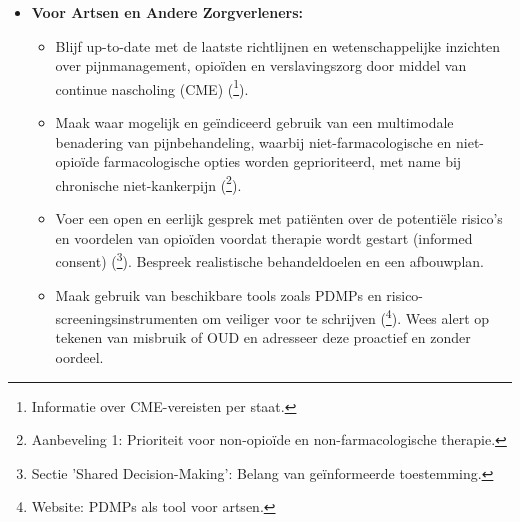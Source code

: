 \documentclass[11pt, a4paper]{report} %
\begin{document}
\begin{itemize}
\begin{itemize}
            \item Investeer in brede preventieprogramma's, gericht op zowel publieksvoorlichting als op het aanpakken van onderliggende sociaaleconomische risicofactoren voor middelengebruik en verslaving (\cite{Yarosh2020ComputationalSupportSUD}\footnote{Sectie 3.1 'Detecting and Mitigating Risk': Noemt preventie en aanpak van risicofactoren.}).
            \item Werk internationaal samen om de illegale productie en handel in fentanyl en andere synthetische drugs aan te pakken, inclusief controle op precursors (\cite{Pardo2019FutureFentanyl}\footnote{Pag. xiii: "International cooperation will be critical..."}).
            \item Werk actief aan het dichten van de mondiale pijnkloof door het ondersteunen van initiatieven die de veilige toegang tot essentiële opioïde pijnstillers in lage- en middeninkomenslanden verbeteren (\cite{INCB2024Report}\footnote{Nieuwsbericht: Roept op tot het adresseren van ongelijkheden in toegang tot pijnmedicatie.}).
        \end{itemize}
    \item \textbf{Voor Artsen en Andere Zorgverleners:}
        \begin{itemize}
            \item Blijf up-to-date met de laatste richtlijnen en wetenschappelijke inzichten over pijnmanagement, opioïden en verslavingszorg door middel van continue nascholing (CME) (\cite{BallotpediaStateLimits}\footnote{Informatie over CME-vereisten per staat.}).
            \item Maak waar mogelijk en geïndiceerd gebruik van een multimodale benadering van pijnbehandeling, waarbij niet-farmacologische en niet-opioïde farmacologische opties worden geprioriteerd, met name bij chronische niet-kankerpijn (\cite{Dowell2016CDCGuideline}\footnote{Aanbeveling 1: Prioriteit voor non-opioïde en non-farmacologische therapie.}).
            \item Voer een open en eerlijk gesprek met patiënten over de potentiële risico's en voordelen van opioïden voordat therapie wordt gestart (informed consent) (\cite{Hooten2021OpioidsChronicPain}\footnote{Sectie 'Shared Decision-Making': Belang van geïnformeerde toestemming.}). Bespreek realistische behandeldoelen en een afbouwplan.
            \item Maak gebruik van beschikbare tools zoals PDMPs en risico-screeningsinstrumenten om veiliger voor te schrijven (\cite{CDCPDMPs}\footnote{Website: PDMPs als tool voor artsen.}). Wees alert op tekenen van misbruik of OUD en adresseer deze proactief en zonder oordeel.

\end{itemize}
\end{itemize}
\end{document}
